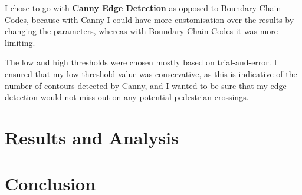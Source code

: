 \documentclass{article}  %
\begin{document}
	I chose to go with \textbf{Canny Edge Detection} as opposed to Boundary Chain Codes, because with Canny I could have more customisation over the results by changing the parameters, whereas with Boundary Chain Codes it was more limiting.
	
	The low and high thresholds were chosen mostly based on trial-and-error. I ensured that my low threshold value was conservative, as this is indicative of the number of contours detected by Canny, and I wanted to be sure that my edge detection would not miss out on any potential pedestrian crossings.
	
	\newpage
	\section{Results and Analysis}
	
	\section*{Conclusion}
\end{document}
